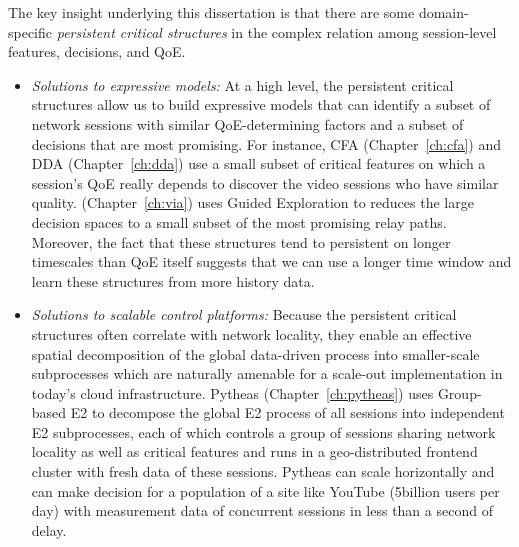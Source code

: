 The key insight underlying this dissertation is that there are some 
domain-specific {\em persistent critical structures} in the complex relation 
among session-level features, decisions, and QoE. 
\begin{itemize}

\item {\em Solutions to expressive models:}
At a high level, the persistent critical structures allow us to build expressive models 
that can identify a subset of network sessions with similar QoE-determining factors
and a subset of decisions that are most promising. For instance,
CFA (Chapter~\ref{ch:cfa}) and DDA (Chapter~\ref{ch:dda}) use a small 
subset of critical features on which a session's QoE really depends to discover the
video sessions who have similar quality. \hybrid (Chapter~\ref{ch:via}) uses 
Guided Exploration to reduces the large decision spaces to a small subset of the 
most promising relay paths. 
Moreover, the fact that these structures tend to  persistent on longer timescales than 
QoE itself suggests that we can use a longer time window and learn these structures 
from more history data.

\item {\em Solutions to scalable control platforms:}
Because the persistent critical structures often correlate with network locality, they 
enable an effective spatial decomposition of the global data-driven process into 
smaller-scale subprocesses which are naturally amenable for a scale-out 
implementation in today's cloud infrastructure.
Pytheas (Chapter~\ref{ch:pytheas}) uses Group-based E2 to decompose the 
global E2 process of all sessions into independent E2 subprocesses, each of which
controls a group of sessions sharing network locality as well as critical features
and runs in a geo-distributed frontend cluster with fresh data of these sessions.
Pytheas can scale horizontally  and can make decision for a population of a site 
like YouTube (5billion users per day) with measurement data of 
concurrent sessions in less than a second of delay.

\end{itemize}



